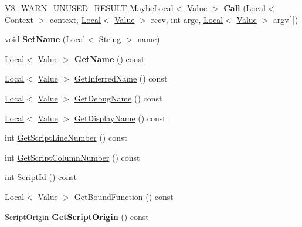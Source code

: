 \begin{DoxyCompactItemize}
\mbox{\label{classv8_1_1Function_a70c400602e70488f7c066b950219a1ad}} 
V8\+\_\+\+W\+A\+R\+N\+\_\+\+U\+N\+U\+S\+E\+D\+\_\+\+R\+E\+S\+U\+LT \mbox{\hyperlink{classv8_1_1MaybeLocal}{Maybe\+Local}}$<$ \mbox{\hyperlink{classv8_1_1Value}{Value}} $>$ {\bfseries Call} (\mbox{\hyperlink{classv8_1_1Local}{Local}}$<$ Context $>$ context, \mbox{\hyperlink{classv8_1_1Local}{Local}}$<$ \mbox{\hyperlink{classv8_1_1Value}{Value}} $>$ recv, int argc, \mbox{\hyperlink{classv8_1_1Local}{Local}}$<$ \mbox{\hyperlink{classv8_1_1Value}{Value}} $>$ argv\mbox{[}$\,$\mbox{]})
\item 
\mbox{\label{classv8_1_1Function_aa9f51cea2036e0caa317e3955109856d}} 
void {\bfseries Set\+Name} (\mbox{\hyperlink{classv8_1_1Local}{Local}}$<$ \mbox{\hyperlink{classv8_1_1String}{String}} $>$ name)
\item 
\mbox{\label{classv8_1_1Function_a2428c830a713b5e54f91cab42f281b01}} 
\mbox{\hyperlink{classv8_1_1Local}{Local}}$<$ \mbox{\hyperlink{classv8_1_1Value}{Value}} $>$ {\bfseries Get\+Name} () const
\item 
\mbox{\hyperlink{classv8_1_1Local}{Local}}$<$ \mbox{\hyperlink{classv8_1_1Value}{Value}} $>$ \mbox{\hyperlink{classv8_1_1Function_aa8cc6843d3df84ff5faf41af41cb07bc}{Get\+Inferred\+Name}} () const
\item 
\mbox{\hyperlink{classv8_1_1Local}{Local}}$<$ \mbox{\hyperlink{classv8_1_1Value}{Value}} $>$ \mbox{\hyperlink{classv8_1_1Function_a36946ff78ea0448d992957fa164187f1}{Get\+Debug\+Name}} () const
\item 
\mbox{\hyperlink{classv8_1_1Local}{Local}}$<$ \mbox{\hyperlink{classv8_1_1Value}{Value}} $>$ \mbox{\hyperlink{classv8_1_1Function_aa889eb7452de7c7a695c5981f603c7cb}{Get\+Display\+Name}} () const
\item 
int \mbox{\hyperlink{classv8_1_1Function_a616f966e538ec32182acd4acb7ee70bc}{Get\+Script\+Line\+Number}} () const
\item 
int \mbox{\hyperlink{classv8_1_1Function_a87bc63f97a9a39f83051570519fc63c2}{Get\+Script\+Column\+Number}} () const
\item 
int \mbox{\hyperlink{classv8_1_1Function_a5070c2657325ed6ca05ebb932c641438}{Script\+Id}} () const
\item 
\mbox{\hyperlink{classv8_1_1Local}{Local}}$<$ \mbox{\hyperlink{classv8_1_1Value}{Value}} $>$ \mbox{\hyperlink{classv8_1_1Function_a33bea08b5ff0c605bde07897cf1c431e}{Get\+Bound\+Function}} () const
\item 
\mbox{\label{classv8_1_1Function_a79197c4c905cd1fb905f242c3d1d31cf}} 
\mbox{\hyperlink{classv8_1_1ScriptOrigin}{Script\+Origin}} {\bfseries Get\+Script\+Origin} () const
\end{DoxyCompactItemize}
